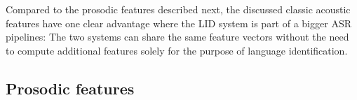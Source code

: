 \documentclass[bsc,frontabs,twoside,singlespacing,parskip,deptreport]{infthesis}
\begin{document}
{{{      %
      Compared to the prosodic features described next, the discussed classic acoustic features have one clear advantage where the LID system is part of a bigger ASR pipelines: The two systems can share the same feature vectors without the need to compute additional features solely for the purpose of language identification.

    }

    \subsection{Prosodic features}{
      \label{sec:prosodic-feats}
        
}}}
\end{document}
